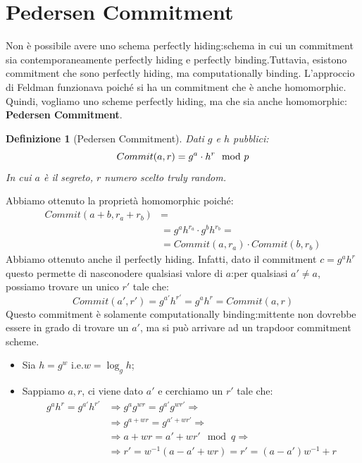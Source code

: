 \documentclass{book}
\newtheorem{Definizione}{\textbf{Definizione}}
\begin{document}
\section{Pedersen Commitment}
Non è possibile avere uno schema perfectly hiding:\@uno schema in cui un commitment sia contemporaneamente perfectly hiding e perfectly binding\@.\newline Tuttavia, esistono commitment che sono perfectly hiding, ma computationally binding\@. L'approccio di Feldman funzionava poiché si ha un commitment che è anche homomorphic\@.\newline
Quindi, vogliamo uno scheme perfectly hiding, ma che sia anche homomorphic: \textbf{Pedersen Commitment}\@.
\begin{Definizione}[Pedersen Commitment] Dati \(g\) e \(h\) pubblici\@:
    \begin{equation*}
        \centering
        Commit(a,r)=g^{a}\cdot h^{r}\mod{p}
    \end{equation*}
    In cui \(a\) è il segreto, \(r\) numero scelto truly random.
\end{Definizione}
Abbiamo ottenuto la proprietà homomorphic poiché:
\begin{align*}
    Commit(a+b,r_{a}+r_{b}) & =                                      \\
                            & =g^{a}h^{r_{a}}\cdot g^{b}h^{r_{b}}=   \\
                            & = Commit(a,r_{a})\cdot Commit(b,r_{b})
\end{align*}
Abbiamo ottenuto anche il perfectly hiding\@. Infatti, dato il commitment \(c=g^{a}h^{r}\) questo permette di nasconodere qualsiasi valore di \(a\):\@ per qualsiasi \(a'\neq a\), possiamo trovare un unico \(r'\) tale che:\begin{equation*}
    Commit(a',r')=g^{a'}h^{r'}=g^{a}h^{r}=Commit(a,r)
\end{equation*}
Questo commitment è solamente computationally binding:\@il mittente non dovrebbe essere in grado di trovare un \(a'\), ma si può arrivare ad un trapdoor commitment scheme\@.
\begin{itemize}
    \item Sia \(h=g^{w}\) i.e.\(w=\log_{g}{h}\);
    \item Sappiamo \(a,r\), ci viene dato \(a'\) e cerchiamo un \(r'\) tale che:
          \begin{align*}
              g^{a}h^{r}=g^{a'}h^{r'} & \Longrightarrow g^{a}g^{wr}=g^{a'}g^{wr'}\Longrightarrow \\
                                      & \Longrightarrow g^{a+wr}=g^{a'+wr'}\Longrightarrow       \\
                                      & \Longrightarrow a+wr=a'+wr' \mod{q}\Longrightarrow       \\
                                      & \Longrightarrow r'=w^{-1}(a-a'+wr)=r'=(a-a')w^{-1}+r
          \end{align*}
\end{itemize}
\end{document}
